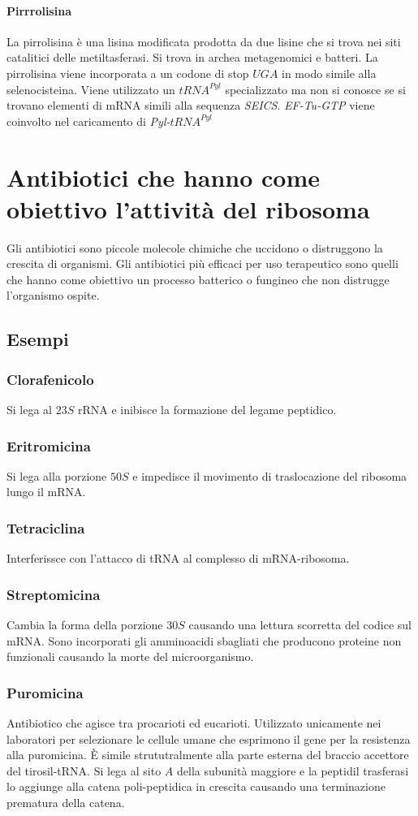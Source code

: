 \paragraph{Pirrrolisina}
La pirrolisina \`e una lisina modificata prodotta da due lisine che si trova nei siti catalitici delle metiltasferasi. Si trova in archea metagenomici e batteri. La pirrolisina viene
incorporata a un codone di stop $UGA$ in modo simile alla selenocisteina. Viene utilizzato un \emph{$tRNA^{Pyl}$} specializzato ma non si conosce se si trovano elementi di mRNA simili
alla sequenza \emph{SEICS}. \emph{EF-Tu-GTP} viene coinvolto nel caricamento di \emph{Pyl-$tRNA^{Pyl}$}
\section{Antibiotici che hanno come obiettivo l'attivit\`a del ribosoma}
Gli antibiotici sono piccole molecole chimiche che uccidono o distruggono la crescita di organismi. Gli antibiotici pi\`u efficaci per uso terapeutico sono quelli che hanno
come obiettivo un processo batterico o fungineo che non distrugge l'organismo ospite. 

\subsection{Esempi}
\subsubsection{Clorafenicolo}
Si lega al $23S$ rRNA e inibisce la formazione del legame peptidico. 
\subsubsection{Eritromicina}
Si lega alla porzione $50S$ e impedisce il movimento di traslocazione del ribosoma lungo il mRNA.
\subsubsection{Tetraciclina}
Interferissce con l'attacco di tRNA al complesso di mRNA-ribosoma.
\subsubsection{Streptomicina}
Cambia la forma della porzione $30S$ causando una lettura scorretta del codice sul mRNA. Sono incorporati gli amminoacidi sbagliati che producono proteine non funzionali causando la morte
del microorganismo.
\subsubsection{Puromicina}
Antibiotico che agisce tra procarioti ed eucarioti. Utilizzato unicamente nei laboratori per selezionare le cellule umane che esprimono il gene per la resistenza alla puromicina. \`E
simile strututralmente alla parte esterna del braccio accettore del tirosil-tRNA. Si lega al sito $A$ della subunit\`a maggiore e la peptidil trasferasi lo aggiunge alla catena 
poli-peptidica in crescita causando una terminazione prematura della catena. 
